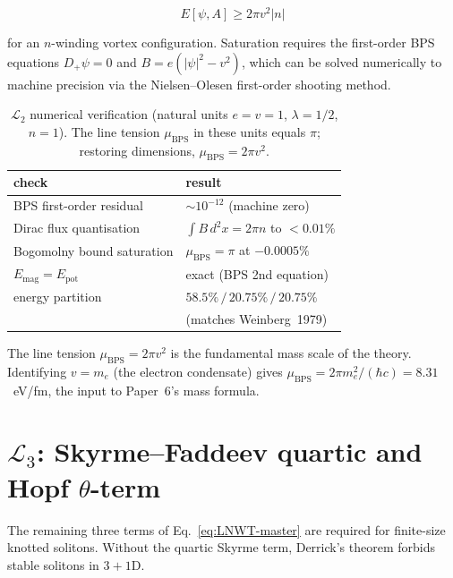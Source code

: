 \documentclass[11pt]{article}
\begin{document}
\begin{equation}
  E[\psi, A]  \geq  2 \pi v^2 |n|
\end{equation}

for an $n$-winding vortex configuration.  Saturation requires the
first-order BPS equations
$D_+ \psi = 0$ and $B = e(|\psi|^2 - v^2)$, which can be solved
numerically to machine precision via the Nielsen--Olesen first-order
shooting method.

\begin{table}[H]
\centering
\renewcommand{\arraystretch}{1.2}
\begin{tabular}{ll}
\toprule
\textbf{check} & \textbf{result} \\
\midrule
BPS first-order residual         & $\sim 10^{-12}$ (machine zero) \\
Dirac flux quantisation          & $\int B\,d^2x = 2\pi n$ to $< 0.01\%$ \\
Bogomolny bound saturation       & $\mu_\text{BPS} = \pi$ at $-0.0005\%$ \\
$E_\text{mag} = E_\text{pot}$    & exact (BPS 2nd equation) \\
energy partition                 & $58.5\% \,/\, 20.75\% \,/\, 20.75\%$ \\
                                 & (matches Weinberg~1979) \\
\bottomrule
\end{tabular}
\caption{$\mathcal{L}_2$ numerical verification (natural units
$e = v = 1$, $\lambda = 1/2$, $n = 1$).
The line tension $\mu_\text{BPS}$ in these units equals $\pi$;
restoring dimensions, $\mu_\text{BPS} = 2 \pi v^2$.}
\end{table}

The line tension $\mu_\text{BPS} = 2 \pi v^2$ is the fundamental
mass scale of the theory.  Identifying $v = m_e$ (the electron
condensate) gives $\mu_\text{BPS} = 2 \pi m_e^2 / (\hbar c) =
8.31$~eV/fm, the input to Paper~6's mass formula.

\section{$\mathcal{L}_3$: Skyrme--Faddeev quartic and Hopf $\theta$-term}
\label{sec:L3}

The remaining three terms of Eq.~\ref{eq:LNWT-master} are required
for finite-size knotted solitons.  Without the quartic Skyrme term,
Derrick's theorem forbids stable solitons in $3{+}1$D.
\end{document}
